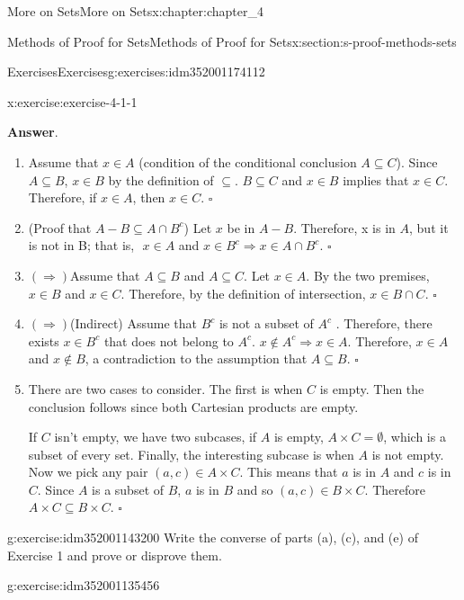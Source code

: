 \documentclass[oneside,10pt,]{book}
\newcommand{\blocktitlefont}{\relax}
\begin{document}
\begin{chapterptx}{More on Sets}{}{More on Sets}{}{}{x:chapter:chapter_4}
\begin{sectionptx}{Methods of Proof for Sets}{}{Methods of Proof for Sets}{}{}{x:section:s-proof-methods-sets}
\begin{exercises-subsection}{Exercises}{}{Exercises}{}{}{g:exercises:idm352001174112}
\begin{divisionexercise}{1}{}{}{x:exercise:exercise-4-1-1}
\begin{enumerate}[label=(\alph*)]
\end{enumerate}
%
\par\smallskip%
\noindent\textbf{\blocktitlefont Answer}.\hypertarget{g:answer:idm352001161680}{}\quad{}%
\begin{enumerate}[label=(\alph*)]
\item{}Assume that \(x\in A\) (condition of the conditional conclusion \(A \subseteq  C\)). Since \(A \subseteq  B\), \(x\in B\) by the definition of \(\subseteq\). \(B\subseteq C\) and \(x\in B\) implies that \(x\in C\). Therefore, if \(x\in A\), then \(x\in C\). \(\square\)%
\item{}(Proof that \(A -B \subseteq A\cap B^c\)) Let \(x\) be in \(A - B\). Therefore, x is in \(A\), but it is not in B; that is,\(\text{  }x \in  A\) and      \(x \in  B^c \Rightarrow x\in A\cap B^c\). \(\square\)%
\item{}\((\Rightarrow )\)Assume that \(A \subseteq  B\) and \(A \subseteq  C\). Let \(x\in A\). By the two premises,\(x\in B\) and \(x\in C\). Therefore, by the      definition of intersection, \(x\in B\cap C\). \(\square\)%
\item{}\((\Rightarrow )\)(Indirect) Assume that \(B^c\) is not a subset of \(A^c\) . Therefore, there exists \(x\in B^c\) that does not  belong to \(A^c\). \(x \notin  A^c \Rightarrow  x \in  A\). Therefore, \(x\in A\) and \(x\notin B\), a contradiction to the assumption that \(A\subseteq B\). \(\square\)%
\item{}There are two cases to consider. The first is when \(C\) is empty. Then the conclusion follows since both Cartesian products are empty.%
\par
If \(C\) isn’t empty, we have two subcases, if \(A\) is empty, \(A\times C = \emptyset\), which is a subset of every set. Finally, the interesting  subcase is when \(A\) is not empty. Now we    pick any pair \((a,c) \in A\times C\). This means that  \(a\) is in \(A\) and \(c\) is in \(C\). Since \(A\) is a subset of \(B\), \(a\) is in \(B\) and so \((a,c) \in B \times C\). Therefore \(A\times C \subseteq B\times C\). \(\square\)%
\end{enumerate}
%
\end{divisionexercise}%
\begin{divisionexercise}{2}{}{}{g:exercise:idm352001143200}%
Write the converse of parts (a), (c), and (e) of Exercise 1 and prove or disprove them.%
\end{divisionexercise}%
\begin{divisionexercise}{3}{}{}{g:exercise:idm352001135456}%

\end{divisionexercise}
\end{exercises-subsection}
\end{sectionptx}
\end{chapterptx}
\end{document}
